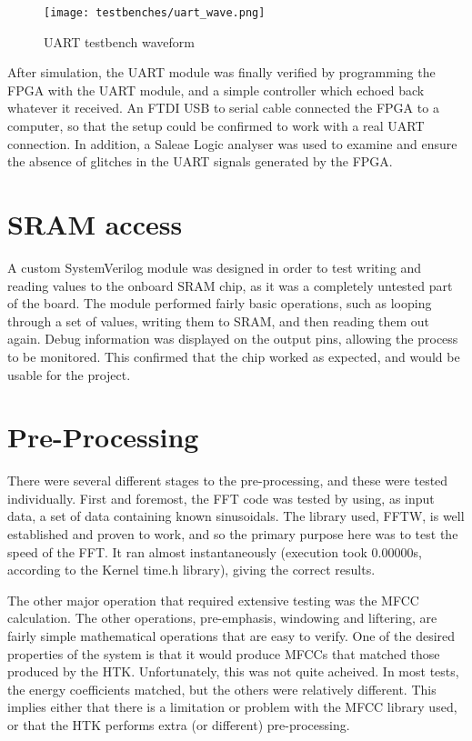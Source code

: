 	\begin{figure}[tb]
		\begin{center}
			\texttt{[image: testbenches/uart\_wave.png]}
		\end{center}
		\caption{UART testbench waveform}
		\label{fig:test_uart}
	\end{figure}

	After simulation, the UART module was finally verified by programming the FPGA with the UART module, and a simple controller which echoed back whatever it received.  An FTDI USB to serial cable connected the FPGA to a computer, so that the setup could be confirmed to work with a real UART connection.  In addition, a Saleae Logic analyser was used to examine and ensure the absence of glitches in the UART signals generated by the FPGA.


\section{SRAM access} %
\label{sec:sram_access_testing}
	A custom SystemVerilog module was designed in order to test writing and reading values to the onboard SRAM chip, as it was a completely untested part of the board.  The module performed fairly basic operations, such as looping through a set of values, writing them to SRAM, and then reading them out again.  Debug information was displayed on the output pins, allowing the process to be monitored.  This confirmed that the chip worked as expected, and would be usable for the project.


\section{Pre-Processing} %
\label{sec:pre_processing_testing}
	There were several different stages to the pre-processing, and these were tested individually.  First and foremost, the FFT code was tested by using, as input data, a set of data containing known sinusoidals.  The library used, FFTW, is well established and proven to work, and so the primary purpose here was to test the speed of the FFT.  It ran almost instantaneously (execution took 0.00000s, according to the Kernel time.h library), giving the correct results. %

	The other major operation that required extensive testing was the MFCC calculation.  The other operations, pre-emphasis, windowing and liftering, are fairly simple mathematical operations that are easy to verify.  One of the desired properties of the system is that it would produce MFCCs that matched those produced by the HTK. Unfortunately, this was not quite acheived.  In most tests, the energy coefficients matched, but the others were relatively different.  This implies either that there is a limitation or problem with the MFCC library used, or that the HTK performs extra (or different) pre-processing.

